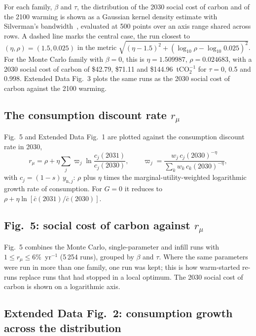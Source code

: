\documentclass[11pt]{article}
\begin{document}
For each family, $\beta$ and $\tau$, the distribution of the 2030 social cost of carbon
and of the 2100 warming is shown as a Gaussian kernel density estimate with
Silverman's bandwidth~\cite{Silverman1986}, evaluated at 500 points over an
axis range shared across rows. A dashed line marks the central case, the run
closest to $(\eta,\rho) = (1.5, 0.025)$ in the metric
$\sqrt{(\eta-1.5)^2 + (\log_{10}\rho - \log_{10}0.025)^2}$. For the Monte
Carlo family with $\beta = 0$, this is $\eta = 1.509987$,
$\rho = 0.024683$, with a 2030 social cost of carbon of \$42.79, \$71.11 and
\$144.96~tCO$_2^{-1}$ for $\tau = 0$, 0.5 and 0.998. Extended Data Fig.~3 plots
the same runs as the 2030 social cost of carbon against the 2100 warming.

\subsection{The consumption discount rate $r_\mu$}
\label{sec:rmu}

Fig.~5 and Extended Data Fig.~1 are plotted against the consumption discount
rate in 2030,
\begin{equation}
  r_\mu = \rho + \eta\sum_j \varpi_j \ln\frac{c_j(2031)}{c_j(2030)},
  \qquad
  \varpi_j = \frac{w_j\,c_j(2030)^{-\eta}}{\sum_k w_k\,c_k(2030)^{-\eta}},
  \label{eq:rmu}
\end{equation}
with $c_j = (1-s)\,y_{\mathrm{n},j}$: $\rho$ plus $\eta$ times the
marginal-utility-weighted logarithmic growth rate of consumption. For $G = 0$
it reduces to $\rho + \eta\ln[\bar c(2031)/\bar c(2030)]$.

\subsection{Fig.~5: social cost of carbon against $r_\mu$}

Fig.~5 combines the Monte Carlo, single-parameter and infill runs with
$1\le r_\mu\le6$\%~yr$^{-1}$ (5\,254 runs), grouped by $\beta$ and $\tau$.
Where the same parameters were run in more than one family, one run was kept;
this is how warm-started re-runs replace runs that had stopped in a local
optimum. The 2030 social cost of carbon is shown on a logarithmic axis.

\subsection{Extended Data Fig.~2: consumption growth across the distribution}
\end{document}
